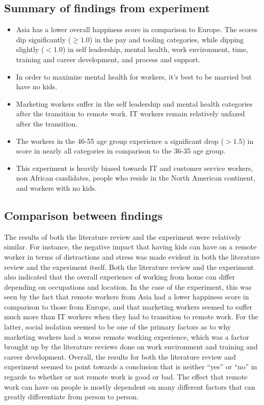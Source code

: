 \documentclass[12pt]{article}
\begin{document}
\subsection*{Summary of findings from experiment}

\begin{itemize}
  \item Asia has a lower overall happiness score in comparison to Europe. The scores dip significantly ($\geq 1.0$) in the pay and tooling categories, while dipping slightly ($< 1.0$) in self leadership, mental health, work environment, time, training and career development, and process and support. 
  \item In order to maximize mental health for workers, it’s best to be married but have no kids.
  \item Marketing workers suffer in the self leadership and mental health categories after the transition to remote work. IT workers remain relatively unfazed after the transition.
  \item The workers in the 46-55 age group experience a significant drop ($> 1.5$) in score in nearly all categories in comparison to the 36-35 age group.
  \item This experiment is heavily biased towards IT and customer service workers, non African candidates, people who reside in the North American continent, and workers with no kids.
\end{itemize}

\subsection*{Comparison between findings}

The results of both the literature review and the experiment were relatively similar. For instance, the negative impact that having kids can have on a remote worker in terms of distractions and stress was made evident in both the literature review and the experiment itself. Both the literature review and the experiment also indicated that the overall experience of working from home can differ depending on occupations and location. In the case of the experiment, this was seen by the fact that remote workers from Asia had a lower happiness score in comparison to those from Europe, and that marketing workers seemed to suffer much more than IT workers when they had to transition to remote work. For the latter, social isolation seemed to be one of the primary factors as to why marketing workers had a worse remote working experience, which was a factor brought up by the literature reviews done on work environment and training and career development. Overall, the results for both the literature review and experiment seemed to point towards a conclusion that is neither “yes” or “no” in regards to whether or not remote work is good or bad. The effect that remote work can have on people is mostly dependent on many different factors that can greatly differentiate from person to person.
\end{document}
